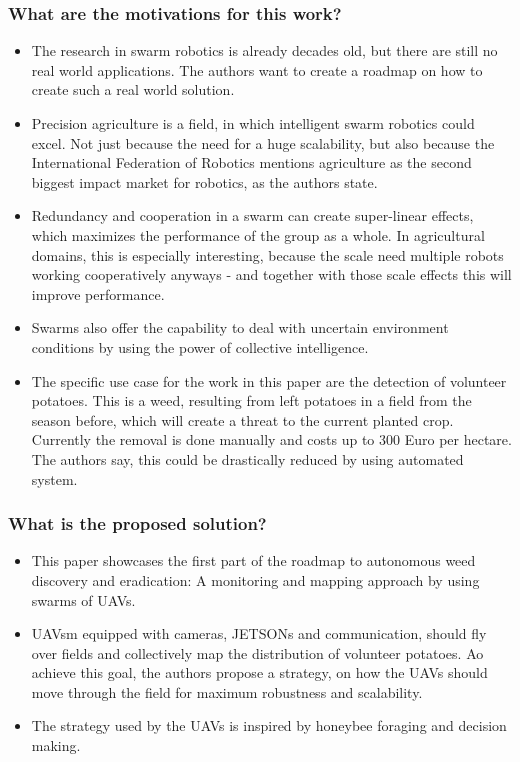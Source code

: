 \documentclass{article}
\begin{document}
\subsubsection*{What are the motivations for this work?}
\begin{itemize}
    \item The research in swarm robotics is already decades old, but there are still no real world applications. The authors want to create a roadmap on how to create such a real world solution.
    \item Precision agriculture is a field, in which intelligent swarm robotics could excel. Not just because the need for a huge scalability, but also because the International Federation of Robotics mentions agriculture as the second biggest impact market for robotics, as the authors state.
    \item Redundancy and cooperation in a swarm can create super-linear effects, which maximizes the performance of the group as a whole. In agricultural domains, this is especially interesting, because the scale need multiple robots working cooperatively anyways - and together with those scale effects this will improve performance.
    \item Swarms also offer the capability to deal with uncertain environment conditions by using the power of collective intelligence.
    \item The specific use case for the work in this paper are the detection of volunteer potatoes. This is a weed, resulting from left potatoes in a field from the season before, which will create a threat to the current planted crop. Currently the removal is done manually and costs up to 300 Euro per hectare. The authors say, this could be drastically reduced by using automated system.
\end{itemize}
\subsubsection*{What is the proposed solution?}
\begin{itemize}
    \item This paper showcases the first part of the roadmap to autonomous weed discovery and eradication: A monitoring and mapping approach by using swarms of UAVs.
    \item UAVsm equipped with cameras, JETSONs and communication, should fly over fields and collectively map the distribution of volunteer potatoes. Ao achieve this goal, the authors propose a strategy, on how the UAVs should move through the field for maximum robustness and scalability.
    \item The strategy used by the UAVs is inspired by honeybee foraging and decision making. 
\end{itemize}
\end{document}
